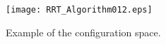 \documentclass{ctuthesis}
\begin{document}
% 
\maketitle
 
\begin{figure}
    \centering
    \texttt{[image: RRT\_Algorithm012.eps]}
    \caption{Example of the configuration space.}
    \label{fig:config_space}
\end{figure} 
\end{document}
